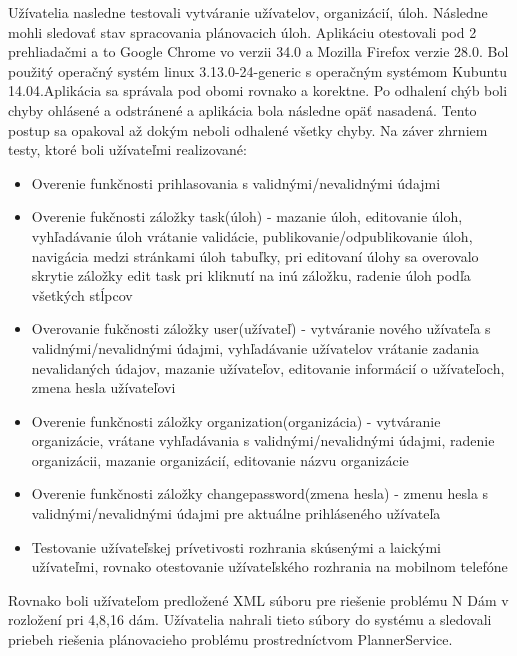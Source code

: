 Užívatelia nasledne testovali vytváranie užívatelov, organizácií, úloh. Následne mohli sledovať stav spracovania plánovacich úloh. Aplikáciu otestovali pod 2 prehliadačmi a to Google Chrome vo verzii 34.0 a Mozilla Firefox verzie 28.0. Bol použitý operačný systém linux 3.13.0-24-generic s operačným systémom Kubuntu 14.04.Aplikácia sa správala pod obomi rovnako a korektne. Po odhalení chýb boli chyby ohlásené a odstránené a aplikácia bola následne opäť nasadená. Tento postup sa opakoval až dokým neboli odhalené všetky chyby. Na záver zhrniem testy, ktoré boli užívateľmi realizované:
\begin{itemize}
\item Overenie funkčnosti prihlasovania s validnými/nevalidnými údajmi
\item Overenie fukčnosti záložky task(úloh) - mazanie úloh, editovanie úloh, vyhľadávanie úloh vrátanie validácie, publikovanie/odpublikovanie úloh, navigácia medzi stránkami úloh tabuľky, pri editovaní úlohy sa overovalo skrytie záložky edit task pri kliknutí na inú záložku, radenie úloh podľa všetkých stĺpcov
\item Overovanie fukčnosti záložky user(užívateľ) - vytváranie nového užívateľa s validnými/nevalidnými údajmi, vyhľadávanie užívatelov vrátanie zadania nevalidaných údajov, mazanie užívateľov, editovanie informácií o užívateľoch, zmena hesla užívateľovi
\item Overenie funkčnosti záložky organization(organizácia) - vytváranie organizácie, vrátane vyhľadávania s validnými/nevalidnými údajmi, radenie organizácii, mazanie organizácií, editovanie názvu organizácie
\item Overenie funkčnosti záložky changepassword(zmena hesla) - zmenu hesla s validnými/nevalidnými údajmi pre aktuálne prihláseného užívateľa
\item Testovanie užívateľskej prívetivosti rozhrania skúsenými a laickými užívateľmi, rovnako otestovanie užívateľského rozhrania na mobilnom telefóne
\end{itemize}

Rovnako boli užívateľom predložené XML súboru pre riešenie problému N Dám v rozložení pri 4,8,16 dám. Užívatelia nahrali tieto súbory do systému a sledovali priebeh riešenia plánovacieho problému prostredníctvom PlannerService.



